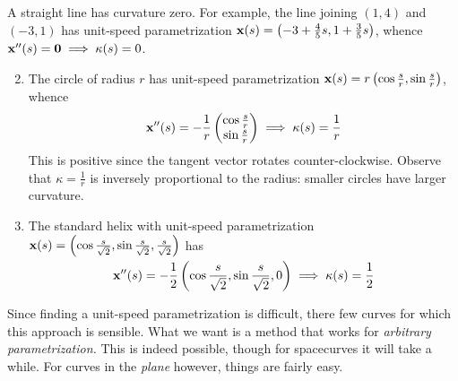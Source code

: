\begin{examples}{}{}
\exstart A straight line has curvature zero. For example, the line joining $(1,4)$ and $(-3,1)$ has unit-speed parametrization ${\mathbf{x}}(s)=\bigl(-3+\frac 45s,1+\frac 35s\bigr)$, whence ${\mathbf{x}}''(s)=\mathbf{0}\implies \kappa(s)=0$.

\begin{enumerate}\setcounter{enumi}{1}
  \item The circle of radius $r$ has unit-speed parametrization ${\mathbf{x}}(s)=r\left(\cos\frac sr,\sin\frac sr\right)$, whence
  \[{\mathbf{x}}''(s)=-\frac 1r\begin{pmatrix}\cos\frac sr\\\sin\frac sr\end{pmatrix}\implies \kappa(s)=\frac 1r\]
  This is positive since the tangent vector rotates counter-clockwise. Observe that $\kappa=\frac 1r$ is inversely proportional to the radius: smaller circles have larger curvature.
    
  \item The standard helix with unit-speed parametrization ${\mathbf{x}}(s)=\smash[b]{\left(\cos\frac s{\sqrt 2},\sin\frac s{\sqrt 2},\frac s{\sqrt 2}\right)}$ has
  \[{\mathbf{x}}''(s)=-\frac 12\left(\cos\frac s{\sqrt 2},\sin\frac s{\sqrt 2},0\right)\implies \kappa(s)=\frac 12\]
  
\end{enumerate}
\end{examples}

Since finding a unit-speed parametrization is difficult, there few curves for which this approach is sensible. What we want is a method that works for \emph{arbitrary parametrization.} This is indeed possible, though for spacecurves it will take a while. For curves in the \emph{plane} however, things are fairly easy.



